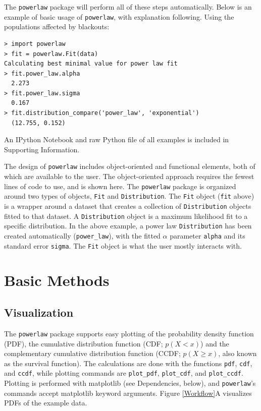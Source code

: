 \documentclass[10pt]{article}
\begin{document}
The \verb$powerlaw$ package will perform all of these steps automatically. Below is an example of basic usage of \verb$powerlaw$, with explanation following. Using the populations affected by blackouts:

\begin{verbatim}
> import powerlaw
> fit = powerlaw.Fit(data)
Calculating best minimal value for power law fit
> fit.power_law.alpha
  2.273
> fit.power_law.sigma
  0.167
> fit.distribution_compare('power_law', 'exponential')
  (12.755, 0.152)
\end{verbatim}

An IPython Notebook and raw Python file of all examples is included in Supporting Information.

The design of \verb$powerlaw$ includes object-oriented and functional elements, both of which are available to the user. The object-oriented approach requires the fewest lines of code to use, and is shown here. The \verb$powerlaw$ package is organized around two types of objects, \verb$Fit$ and \verb$Distribution$. The \verb$Fit$ object (\verb$fit$ above) is a wrapper around a dataset that creates a collection of \verb$Distribution$ objects fitted to that dataset. A \verb$Distribution$ object is a maximum likelihood fit to a specific distribution. In the above example, a power law \verb$Distribution$ has been created automatically (\verb$power_law$), with the fitted $\alpha$ parameter \verb$alpha$ and its standard error \verb$sigma$. The \verb$Fit$ object is what the user mostly interacts with.

\section*{Basic Methods}
\subsection*{Visualization}
The \verb$powerlaw$ package supports easy plotting of the probability density function (PDF), the cumulative distribution function (CDF; $p(X<x)$) and the complementary cumulative distribution function (CCDF; $p(X\geq x)$, also known as the survival function). The calculations are done with the functions \verb$pdf$, \verb$cdf$, and \verb$ccdf$, while plotting commands are \verb$plot_pdf$, \verb$plot_cdf$, and \verb$plot_ccdf$. Plotting is performed with matplotlib (see Dependencies, below), and \verb$powerlaw$'s commands accept matplotlib keyword arguments. Figure \ref{Workflow}A visualizes PDFs of the example data.
\end{document}
